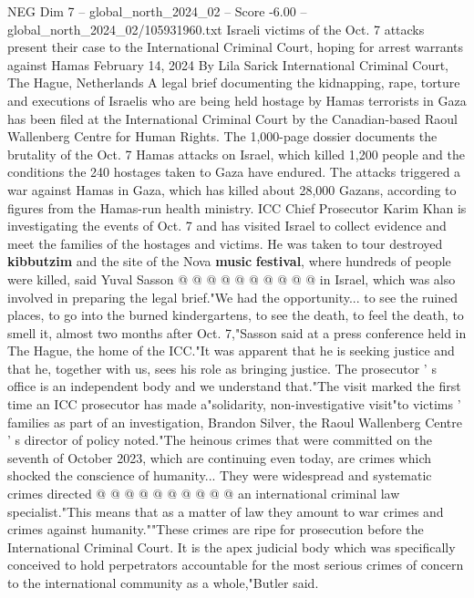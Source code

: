 \begin{textsample}{NEG Dim 7 – global\_north\_2024\_02 – Score -6.00 – global\_north\_2024\_02/105931960.txt}  \label{ex:f7_neg_290}
Israeli victims of the Oct. 7 attacks present their case to the International Criminal Court, hoping for arrest warrants against Hamas February 14, 2024 By Lila Sarick International Criminal Court, The Hague, Netherlands A legal brief documenting the kidnapping, rape, torture and executions of Israelis who are being held hostage by Hamas terrorists in Gaza has been filed at the International Criminal Court by the Canadian-based Raoul Wallenberg Centre for Human Rights.
The 1,000-page dossier documents the brutality of the Oct. 7 Hamas attacks on Israel, which killed 1,200 people and the conditions the 240 hostages taken to Gaza have endured.
The attacks triggered a war against Hamas in Gaza, which has killed about 28,000 Gazans, according to figures from the Hamas-run health ministry.
ICC Chief Prosecutor Karim Khan is investigating the events of Oct. 7 and has visited Israel to collect evidence and meet the families of the hostages and victims.
He was taken to tour destroyed \textbf{kibbutzim} and the site of the Nova \textbf{music} \textbf{festival}, where hundreds of people were killed, said Yuval Sasson @ @ @ @ @ @ @ @ @ @ in Israel, which was also involved in preparing the legal brief."We had the opportunity... to see the ruined places, to go into the burned kindergartens, to see the death, to feel the death, to smell it, almost two months after Oct. 7,"Sasson said at a press conference held in The Hague, the home of the ICC."It was apparent that he is seeking justice and that he, together with us, sees his role as bringing justice.
The prosecutor ' s office is an independent body and we understand that."The visit marked the first time an ICC prosecutor has made a"solidarity, non-investigative visit"to victims ' families as part of an investigation, Brandon Silver, the Raoul Wallenberg Centre ' s director of policy noted."The heinous crimes that were committed on the seventh of October 2023, which are continuing even today, are crimes which shocked the conscience of humanity...
They were widespread and systematic crimes directed @ @ @ @ @ @ @ @ @ @ an international criminal law specialist."This means that as a matter of law they amount to war crimes and crimes against humanity.""These crimes are ripe for prosecution before the International Criminal Court.
It is the apex judicial body which was specifically conceived to hold perpetrators accountable for the most serious crimes of concern to the international community as a whole,"Butler said.

\end{textsample}
